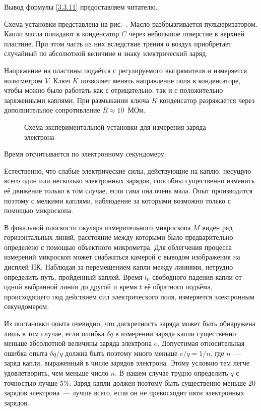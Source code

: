 Вывод формулы \eqref{3.3.11} предоставляем читателю.

\experiment Схема установки представлена на рис.~. Масло разбрызгивается пульверизатором. Капли масла попадают в конденсатор $C$ через небольшое отверстие в верхней пластине. При этом часть из них вследствие трения о воздух приобретает случайный по абсолютной величине и знаку электрический заряд.

Напряжение на пластины подаётся с регулируемого выпрямителя и измеряется вольтметром $V$. Ключ $K$ позволяет менять направление поля в конденсаторе, чтобы можно было работать  как с отрицательно, так и с положительно заряженными каплями. При размыкании ключа $K$ конденсатор разряжается через дополнительное сопротивление $R\approx 10$~МОм.
\begin{figure}[h!]
	\caption{Схема экспериментальной установки для измерения заряда электрона}
\end{figure}
Время отсчитывается по электронному секундомеру.

Естественно, что слабые электрические силы, действующие на каплю, несущую всего один или несколько электронных зарядов, способны существенно изменить её движение только в том случае, если сама она очень мала. Опыт производится поэтому с мелкими каплями, наблюдение за которыми возможно только с помощью микроскопа.

В фокальной плоскости окуляра измерительного микроскопа $M$ виден ряд горизонтальных линий, расстояние между которыми было предварительно определено с помощью объектного микрометра. Для облегчения процесса измерений микроскоп может снабжаться камерой с выводом изображения на дисплей ПК. Наблюдая за перемещением капли между линиями, нетрудно определить путь, пройденный каплей. Время $t_0$ свободного падения капли от одной выбранной линии до другой и время $t$ её обратного подъёма, происходящего под действием сил электрического поля, измеряется электронным секундомером.

Из постановки опыта очевидно, что дискретность заряда может быть обнаружена лишь в том случае, если ошибка $\delta q$ в измерении заряда капли существенно меньше абсолютной величины заряда электрона $e$. Допустимая относительная ошибка опыта $\delta q/q$ должна быть поэтому много меньше $e/q=1/n$, где $n$~--- заряд капли, выраженный в числе зарядов электрона. Этому условию тем легче удовлетворить, чем меньше число $n$. В нашем случае трудно определить $q$ с точностью лучше 5\%. Заряд капли должен поэтому быть существенно меньше 20 зарядов электрона~--- лучше всего, если он не превосходит пяти электронных зарядов.

